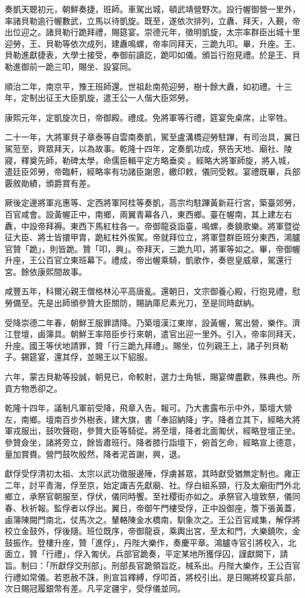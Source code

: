 \begin{pinyinscope}
奏凱天聰初元，朝鮮奏捷，班師。車駕出城，頓武靖營野次。設行幄御營一里外，率諸貝勒逾行幄數武，立馬以待凱旋。既至，遂依次排列，立纛、拜天，入覲，帝出位迎之。諸貝勒行跪拜禮，賜筵宴。崇德元年，徵明凱旋，太宗率群臣出城十里迎勞，王、貝勒等依次成列，建纛鳴螺，帝率同拜天，三跪九叩。畢，升座。王、貝勒進獻捷表，大學士接受，奉御前讀訖，跪叩如儀。頒旨行抱見禮。於是王、貝勒進御前一跪三叩，賜坐、設宴同。

順治二年，南京平，豫王班師還。世祖赴南苑迎勞，樹十餘大纛，如初禮。十三年，定制出征王大臣凱旋，遣王公一人偕大臣郊勞。

康熙元年，定凱旋次日，帝御殿。禮成。免將軍等行禮，筵宴免桌席，止宰牲。

二十一年，大將軍貝子章泰等自雲南奏凱，駕至盧溝橋迎勞駐蹕，有司治具，翼日駕蒞至，齊眾拜天，以為故事。乾隆十四年，定奏凱功成，祭告天地、廟社、陵寢，釋奠先師，勒碑太學，命儒臣輯平定方略垂奕。經略大將軍師旋，將入城，遣廷臣郊勞，帝臨軒，經略率有功諸臣謝恩，繳印敕，儀同受敕。宴禮既畢，兵部覈敘勛績，頒爵賞有差。

厥後定邊將軍兆惠等、定西將軍阿桂等奏凱，高宗均駐蹕黃新莊行宮，築臺郊勞，百官咸會。設黃幄正中，南鄉，兩翼青幕各八，東西鄉。臺在幄南，其上建左右纛，中設帝拜褥。東西下馬紅柱各一。帝御龍袞詣臺，鳴螺，奏鐃歌樂。將軍暨從征大臣、將士皆擐甲胄，跪紅柱外俟駕。帝就拜位立，將軍暨群臣班分東西，鴻臚官贊「跪」，則皆跪。贊「叩，興」。帝拜天，三跪九叩，將軍等如之。畢，帝御幄升座，王公百官立東班幕下。禮成，帝出幄乘騎，凱歌作，奏鬯皇威章，駕還行宮。餘依康熙間故事。

咸豐五年，科爾沁親王僧格林沁平高唐亂。還朝日，文宗御養心殿，行抱見禮，慰勞備至。先是出師頒參贊大臣關防，賜訥庫尼素光刀，至是同時獻納。

受降崇德二年春，朝鮮王服罪請降。乃築壇漢江東岸，設黃幄，駕出營，樂作。濟江登壇，鹵簿具。朝鮮王率陪臣步行來朝，遣官出迎一里外。引入，帝率同拜天，升座。國王等伏地請罪，贊「行三跪九拜禮」。賜坐，位列親王上，諸子列貝勒子。錫筵宴，還其俘，並賜王以下貂服。

六年，蒙古貝勒等投誠，朝見已，命較射，選力士角牴，賜宴俾盡歡，殊典也。所貢方物悉卻之。

乾隆十四年，議制凡軍前受降，飛章入告。報可。乃大書露布示中外，築壇大營左，南鄉。壇南百步外樹表，建大旗，書「奉詔納降」字。降者立其下，經略大將軍戎服出，鼓吹聲砲，參贊大臣等騎從。將至壇，降者北面匍伏，經略登壇正坐。參贊僉坐，諸將旁立，餘皆肅班行。降者膝行詣壇下，俯首乞命，經略宣上德意，量加賞賚。營門鼓吹殷然，降者泥首謝，興，退。

獻俘受俘清初太祖、太宗以武功徵服邊陲，俘虜甚眾，其時獻受猶無定制也。雍正二年，討平青海，俘至京，始定諏吉先獻廟、社。俘白組系頸，行及太廟街門外北鄉立，承祭官朝服至，俘伏，儀同時饗。至社稷街亦如之。承祭官入壇致祭，儀同春、秋祈報。監俘者以俘出。翼日，帝御午門樓受俘，正中設御座，簷下張黃蓋，鹵簿陳闕門南北，仗馬次之。輦輅陳金水橋南，馴象次之。王公百官咸集，解俘將校立金鼓外，俘後隨。班位既序，帝御龍袞，乘輿出宮，至太和門，大樂鐃吹，金鼓振作。登樓升座，贊「進俘」，丹陛大樂作，奏慶平章。鴻臚寺官引將校入，北面立，贊「行禮」，俘入匍伏。兵部官跪奏，平定某地所獲俘囚，謹獻闕下，請旨。制曰：「所獻俘交刑部」。刑部長官跪領旨訖，械系出。丹陛大樂作，王公百官行禮如常儀。若恩赦不誅，則宣旨釋縛，俘叩首，將校引出。是日賜將校宴兵部，次日賜冠履銀幣有差。凡平定疆宇，受俘儀並同。


\end{pinyinscope}
